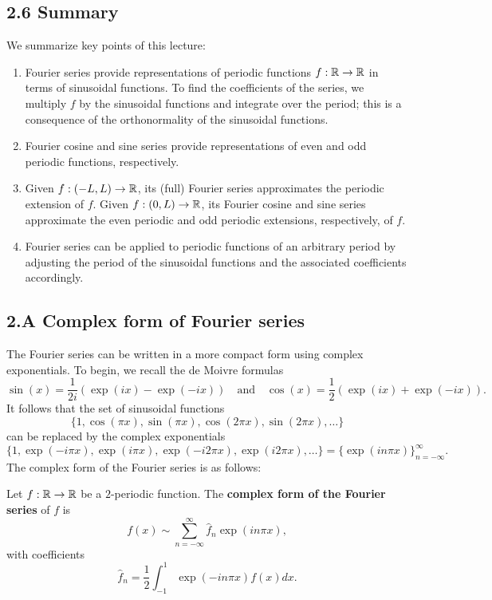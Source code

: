\subsection{2.6 Summary}
We summarize key points of this lecture:
\begin{enumerate}
    \item Fourier series provide representations of periodic functions $f : \mathbb{R} \to \mathbb{R}$ in terms of sinusoidal functions. To find the coefficients of the series, we multiply $f$ by the sinusoidal functions and integrate over the period; this is a consequence of the orthonormality of the sinusoidal functions.
    \item Fourier cosine and sine series provide representations of even and odd periodic functions, respectively.
    \item Given $f : (-L, L) \to \mathbb{R}$, its (full) Fourier series approximates the periodic extension of $f$. Given $f : (0, L) \to \mathbb{R}$, its Fourier cosine and sine series approximate the even periodic and odd periodic extensions, respectively, of $f$.
    \item Fourier series can be applied to periodic functions of an arbitrary period by adjusting the period of the sinusoidal functions and the associated coefficients accordingly.
\end{enumerate}

\subsection{2.A Complex form of Fourier series}
The Fourier series can be written in a more compact form using complex exponentials. To begin, we recall the de Moivre formulas
\[\sin(x) = \frac{1}{2i} (\exp(ix) - \exp(-ix)) \quad \text{and} \quad \cos(x) = \frac{1}{2} (\exp(ix) + \exp(-ix)).\]
It follows that the set of sinusoidal functions
\[\{1, \cos(\pi x), \sin(\pi x), \cos(2\pi x), \sin(2\pi x), \dots\}\]
can be replaced by the complex exponentials
\[\{1, \exp(-i\pi x), \exp(i\pi x), \exp(-i2\pi x), \exp(i2\pi x), \dots\} = \{\exp(in\pi x)\}_{n=-\infty}^{\infty}.\]
The complex form of the Fourier series is as follows:

\begin{definition}
    Let $f : \mathbb{R} \to \mathbb{R}$ be a $2$-periodic function. The \textbf{complex form of the Fourier series} of $f$ is
    \begin{equation*}
        f(x) \sim \sum_{n=-\infty}^{\infty} \hat{f}_n \exp(in\pi x), \tag{2.5}
    \end{equation*}
    with coefficients
    \[\hat{f}_n = \frac{1}{2} \int_{-1}^{1} \exp(-in\pi x) f(x) dx.\]
\end{definition}

